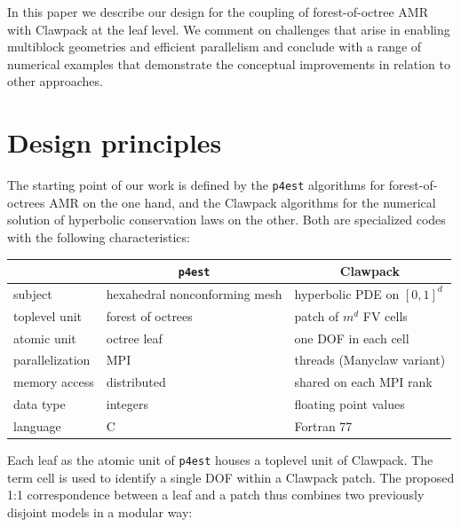 \documentclass{IOS-Book-Article}     %
\newcommand{\comment}[1]{\textcolor{green}{[DAC: #1]}\xspace}
\newcommand{\clawpack}{{\sc Clawpack}\xspace}
\newcommand{\pforest}{\texttt{p4est}\xspace}
\newcommand{\manyclaw}{Manyclaw\xspace}
\begin{document}
In this paper we describe our design for the coupling of forest-of-octree AMR
with \clawpack at the leaf level.  We comment on challenges that arise in
enabling multiblock geometries and efficient parallelism and conclude with a range
of numerical examples that demonstrate the conceptual improvements in relation
to other approaches.

\section{Design principles}

The starting point of our work is defined by the \pforest algorithms for
forest-of-octrees AMR on the one hand, and the \clawpack algorithms for the
numerical solution of hyperbolic conservation laws
on the other.  Both are specialized codes with the following characteristics:
\begin{center}
\begin{tabular}{l|l|l}
& \multicolumn{1}{c|}{\pforest} & \multicolumn{1}{c}{\clawpack} \\
\hline
subject & hexahedral nonconforming mesh &  hyperbolic PDE on $[0, 1]^d$ \\
toplevel unit & forest of octrees & patch of $m^d$ FV cells \\
atomic unit & octree leaf & one DOF in each cell \\
parallelization & MPI & threads (\manyclaw variant) \\
memory access & distributed & shared on each MPI rank \\
data type & integers & floating point values \\
language & C & Fortran 77 \\
\end{tabular}
\end{center}
Each leaf as the atomic unit of \pforest houses a toplevel unit of \clawpack.
The term cell is used to identify a single DOF within a \clawpack patch.  The
proposed 1:1 correspondence between a leaf and a patch thus combines two
previously disjoint models in a modular way:
\end{document}

